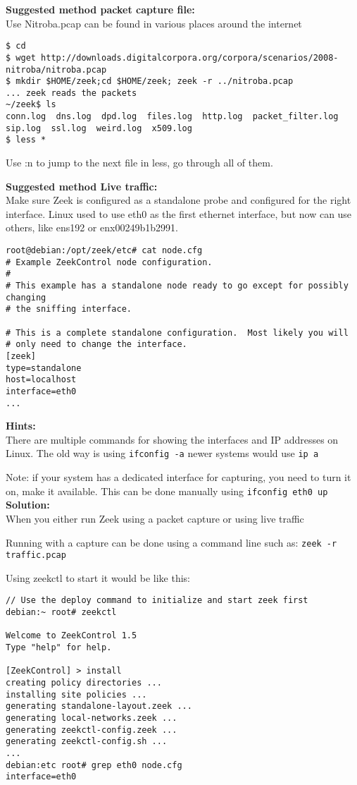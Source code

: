 \documentclass[a4paper,11pt,notitlepage]{report}
\begin{document}
{\bf Suggested method packet capture file:}\\
Use Nitroba.pcap can be found in various places around the internet

\begin{verbatim}
$ cd
$ wget http://downloads.digitalcorpora.org/corpora/scenarios/2008-nitroba/nitroba.pcap
$ mkdir $HOME/zeek;cd $HOME/zeek; zeek -r ../nitroba.pcap
... zeek reads the packets
~/zeek$ ls
conn.log  dns.log  dpd.log  files.log  http.log  packet_filter.log
sip.log  ssl.log  weird.log  x509.log
$ less *
\end{verbatim}

Use :n to jump to the next file in less, go through all of them.

{\bf Suggested method Live traffic:}\\
Make sure Zeek is configured as a standalone probe and configured for the right interface. Linux used to use eth0 as the first ethernet interface, but now can use others, like ens192 or enx00249b1b2991.

\begin{verbatim}
root@debian:/opt/zeek/etc# cat node.cfg
# Example ZeekControl node configuration.
#
# This example has a standalone node ready to go except for possibly changing
# the sniffing interface.

# This is a complete standalone configuration.  Most likely you will
# only need to change the interface.
[zeek]
type=standalone
host=localhost
interface=eth0
...
\end{verbatim}


{\bf Hints:}\\
There are multiple commands for showing the interfaces and IP addresses on Linux. The old way is using \verb+ifconfig -a+ newer systems would use \verb+ip a+

Note: if your system has a dedicated interface for capturing, you need to turn it on, make it available. This can be done manually using \verb+ifconfig eth0 up+
{\bf Solution:}\\
When you either run Zeek using a packet capture or using live traffic

Running with a capture can be done using a command line such as:
\verb+zeek -r traffic.pcap+

Using zeekctl to start it would be like this:
\begin{verbatim}
// Use the deploy command to initialize and start zeek first
debian:~ root# zeekctl

Welcome to ZeekControl 1.5
Type "help" for help.

[ZeekControl] > install
creating policy directories ...
installing site policies ...
generating standalone-layout.zeek ...
generating local-networks.zeek ...
generating zeekctl-config.zeek ...
generating zeekctl-config.sh ...
...
debian:etc root# grep eth0 node.cfg
interface=eth0
\end{verbatim}
\end{document}

